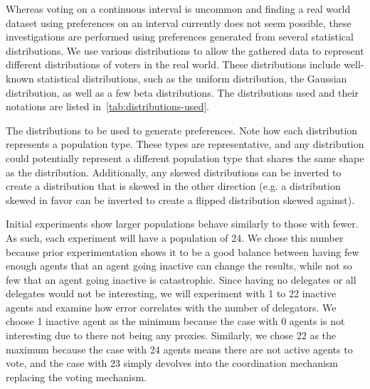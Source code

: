Whereas voting on a continuous interval is uncommon and finding a real world dataset
using preferences on an interval currently does not seem possible, these investigations
are performed using preferences generated from several statistical distributions.
We use various distributions to allow the gathered data to represent
different distributions of voters in the real world.
These distributions include well-known statistical distributions, such as the uniform
distribution, the Gaussian distribution, as well as a few beta distributions.
The distributions used and their notations are listed
in~\autoref{tab:distributions-used}.

\begin{table}[!htbp]
    \renewcommand{\arraystretch}{1.3}

    \caption{
        The distributions to be used to generate preferences.
        Note how each distribution represents a population type.
        These types are representative, and any distribution could potentially
        represent a different population type that shares the same shape as the
        distribution.
        Additionally, any skewed distributions can be inverted to create a
        distribution that is skewed in the other direction (e.g. a distribution
        skewed in favor can be inverted to create a flipped distribution skewed
        against).
    }
    \label{tab:distributions-used}

    \centering
    
\end{table}

Initial experiments show larger populations behave similarly to those with fewer.
As such, each experiment will have a population of 24.
We chose this number because prior experimentation shows it to be a good balance
between having few enough agents that an agent going inactive can change the
results, while not so few that an agent going inactive is catastrophic.
Since having no delegates or all delegates would not be interesting, we will
experiment with 1 to 22 inactive agents and examine how error correlates with
the number of delegators.
We choose 1 inactive agent as the minimum because the case with 0 agents is not
interesting due to there not being any proxies.  
Similarly, we chose 22 as the maximum because the case with 24 agents means there are
not active agents to vote, and the case with 23 simply devolves into the coordination
mechanism replacing the voting mechanism.

